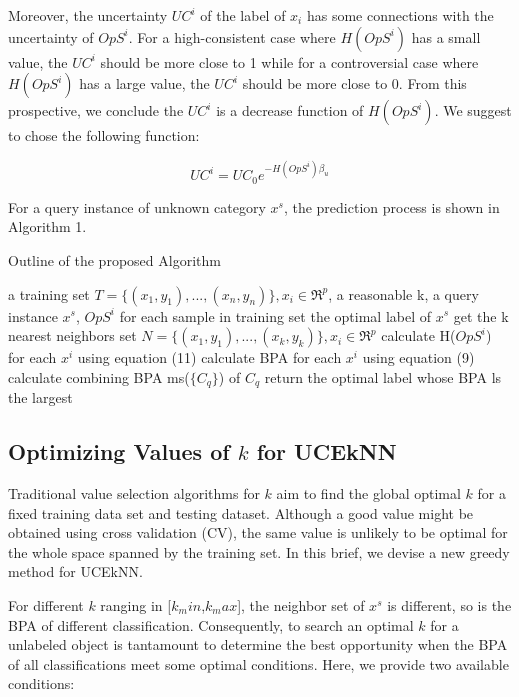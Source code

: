 \documentclass[runningheads]{llncs}
\begin{document}
Moreover, the uncertainty $UC^i$ of the label of $x_i$ has some connections with the uncertainty of $OpS^i$. For a high-consistent case where $H(OpS^i)$ has a small value, the $UC^i$ should be more close to 1 while for a controversial case where $H(OpS^i)$ has a large value, the $UC^i$ should be more close to 0. From this prospective, we conclude the $UC^i$ is a decrease function of $H(OpS^i)$. We suggest to chose the following function:

\begin{equation}
UC^i=UC_0e^{-H(OpS^i)\beta_u}
\end{equation}

For a query instance of unknown category $x^s$, the prediction process is shown in Algorithm 1.


\begin{algorithm} %
\caption{Outline of the proposed Algorithm} %
\label{alg1} %
\begin{algorithmic}[1] %
\REQUIRE  a training set $T=\{(x_1,y_1),...,(x_n,y_n)\}, x_i \in \Re ^p$,  a reasonable k, a query instance $x^s$, $OpS^i$ for each sample in training set %
\ENSURE the optimal label of $x^s$ %
\STATE get the k  nearest neighbors set $N=\{(x_1,y_1),...,(x_k,y_k)\}, x_i \in \Re ^p$
\STATE calculate H($OpS^i$) for each $x^i$ using equation (11)
\STATE  calculate BPA for each $x^i$ using equation (9)
\ENDFOR
{}
\STATE  calculate combining BPA ms($\{C_q\}$) of $C_q$
\ENDFOR
\STATE return the optimal label whose BPA ls the largest
\end{algorithmic}
\end{algorithm}
\subsection{Optimizing Values of $k$ for UCEkNN}
Traditional value selection algorithms for $k$ aim to find the global optimal $k$ for a fixed training data set and testing dataset. Although a good value might be obtained using cross validation (CV), the same value is unlikely to be optimal for the whole space spanned by the training set. In this brief, we devise a new greedy method for UCEkNN.

For different $k$ ranging in [$k_min$,$k_max$], the neighbor set of $x^s$ is different, so is the BPA of different classification. Consequently, to search an optimal $k$ for a unlabeled object is tantamount to determine the best opportunity when the BPA of all classifications meet some optimal conditions. Here, we provide two available conditions: 
\end{document}
